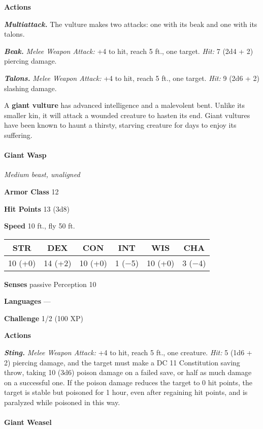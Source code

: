 \documentclass[
]{article}
\begin{document}
\textbf{Actions}

\emph{\textbf{Multiattack.}} The vulture makes two attacks: one with its
beak and one with its talons.

\emph{\textbf{Beak.}} \emph{Melee Weapon Attack:} +4 to hit, reach 5
ft., one target. \emph{Hit:} 7 (2d4 + 2) piercing damage.

\emph{\textbf{Talons.}} \emph{Melee Weapon Attack:} +4 to hit, reach 5
ft., one target. \emph{Hit:} 9 (2d6 + 2) slashing damage.

A \textbf{giant vulture} has advanced intelligence and a malevolent
bent. Unlike its smaller kin, it will attack a wounded creature to
hasten its end. Giant vultures have been known to haunt a thirsty,
starving creature for days to enjoy its suffering.

\hypertarget{giant-wasp}{%
\paragraph{Giant Wasp}\label{giant-wasp}}

\emph{Medium beast, unaligned}

\textbf{Armor Class} 12

\textbf{Hit Points} 13 (3d8)

\textbf{Speed} 10 ft., fly 50 ft.

\begin{longtable}[]{@{}cccccc@{}}
\toprule
STR & DEX & CON & INT & WIS & CHA\tabularnewline
\midrule
\endhead
10 (+0) & 14 (+2) & 10 (+0) & 1 (−5) & 10 (+0) & 3 (−4)\tabularnewline
\bottomrule
\end{longtable}

\textbf{Senses} passive Perception 10

\textbf{Languages} ---

\textbf{Challenge} 1/2 (100 XP)

\textbf{Actions}

\emph{\textbf{Sting.}} \emph{Melee Weapon Attack:} +4 to hit, reach 5
ft., one creature. \emph{Hit:} 5 (1d6 + 2) piercing damage, and the
target must make a DC 11 Constitution saving throw, taking 10 (3d6)
poison damage on a failed save, or half as much damage on a successful
one. If the poison damage reduces the target to 0 hit points, the target
is stable but poisoned for 1 hour, even after regaining hit points, and
is paralyzed while poisoned in this way.

\hypertarget{giant-weasel}{%
\paragraph{Giant Weasel}\label{giant-weasel}}
\end{document}
